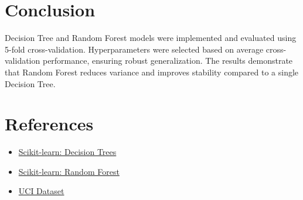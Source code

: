 \documentclass[11pt]{article}
\begin{document}

\section*{Conclusion}
Decision Tree and Random Forest models were implemented and evaluated using 5-fold cross-validation.  
Hyperparameters were selected based on average cross-validation performance, ensuring robust generalization.  
The results demonstrate that Random Forest reduces variance and improves stability compared to a single Decision Tree.


\section*{References}
\begin{itemize}
    \item \href{https://scikit-learn.org/stable/modules/tree.html}{Scikit-learn: Decision Trees}
    \item \href{https://scikit-learn.org/stable/modules/ensemble.html}{Scikit-learn: Random Forest}
    \item \href{https://archive.ics.uci.edu/dataset/17/breast+cancer+wisconsin+diagnostic}{UCI Dataset}
\end{itemize}
\end{document}
